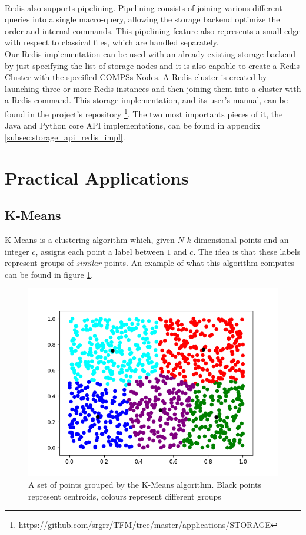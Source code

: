 \\
Redis also supports pipelining. Pipelining consists of joining various different queries into a single macro-query, allowing the storage backend optimize the order and internal commands. This pipelining feature also represents a small edge with respect to classical files, which are handled separately.
\\
Our Redis implementation can be used with an already existing storage backend by just specifying the list of storage nodes and it is also capable to create a Redis Cluster with the specified COMPSs Nodes. A Redis cluster is created by launching three or more Redis instances and then joining them into a cluster with a Redis command. This storage implementation, and its user's manual, can be found in the project's repository \footnote{https://github.com/srgrr/TFM/tree/master/applications/STORAGE}. The two most importants pieces of it, the Java and Python core API implementations, can be found in appendix \ref{subsec:storage_api_redis_impl}.

\section{Practical Applications}
\label{subsec:storage_apps}
\subsection{K-Means}
\label{subsubsec:kmeans_redis}
K-Means \cite{Lloyd82leastsquares} is a clustering algorithm which, given $N$ $k$-dimensional points and an integer $c$, assigns each point a label between $1$ and $c$. The idea is that these labels represent groups of \textit{similar} points. An example of what this algorithm computes can be found in figure \ref{fig:kmeans_example}.

\begin{figure}
\centering
\includegraphics[scale = 0.5]{figures/kmeans_example.png}
\caption{A set of points grouped by the K-Means algorithm. Black points represent centroids, colours represent different groups}
\label{fig:kmeans_example}
\end{figure}

